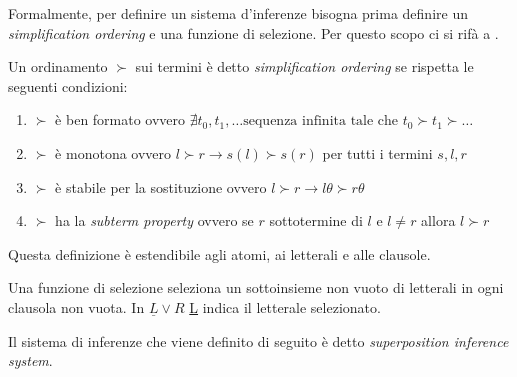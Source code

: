 Formalmente, per definire un sistema d'inferenze bisogna prima definire un \emph{simplification ordering} e una funzione di selezione.
Per questo scopo ci si rifà a \cite{kovacs2013first,riazanov2002design}.
\begin{definition}
    Un ordinamento $\succ$ sui termini è detto \emph{simplification ordering} se rispetta le seguenti condizioni:
    \begin{enumerate}
        \item $\succ$ è ben formato ovvero $\nexists t_0,t_1, \dots \text{sequenza infinita tale che } t_0 \succ t_1 \succ \dots$
        \item $\succ$ è monotona ovvero $l \succ r \rightarrow s(l)\succ s(r)$ per tutti i termini $s,l,r$
        \item $\succ$ è stabile per la sostituzione ovvero $l \succ r \rightarrow l\theta \succ r\theta$
        \item $\succ$ ha la \emph{subterm property} ovvero se $r$ sottotermine di $l$ e $l\neq r$ allora $l\succ r$   
    \end{enumerate}
\end{definition}
Questa definizione è estendibile agli atomi, ai letterali e alle clausole.
\begin{definition}
    Una funzione di selezione seleziona un sottoinsieme non vuoto di letterali in ogni clausola non vuota. In $\underline{L}\lor R$ \underline{L} indica il letterale selezionato.
\end{definition}
Il sistema di inferenze che viene definito di seguito è detto \emph{superposition inference system}.
